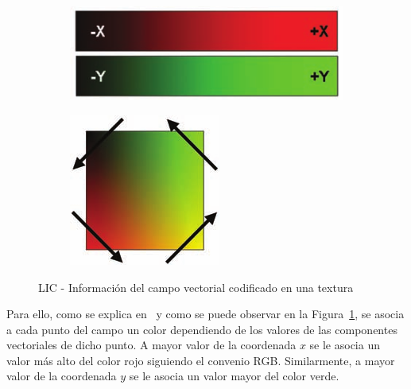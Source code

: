 \begin{figure}[b]
	\centering	
	\begin{subfigure}{0.7\textwidth}
			\includegraphics[width=\textwidth]{figures/lictexture2.png}	
	\end{subfigure}
	\begin{subfigure}{0.28\textwidth}
			\includegraphics[width=\textwidth]{figures/lictexture.png}	
	\end{subfigure}
	\caption{LIC - Información del campo vectorial codificado en una textura}
	\label{fig:lictexture}
\end{figure}

Para ello, como se explica en~\citet{Bailey} y como se puede observar en la
Figura~\ref{fig:lictexture}, se asocia a cada punto del campo un color
dependiendo de los valores de las componentes vectoriales de dicho punto. A
mayor valor de la coordenada $x$ se le asocia un valor más alto del color rojo
siguiendo el convenio RGB. Similarmente, a mayor valor de la coordenada $y$ se
le asocia un valor mayor del color verde. 

